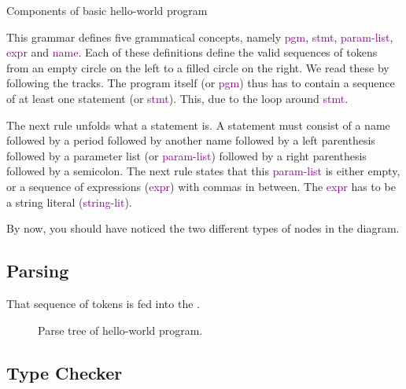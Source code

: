 \begin{syntaxfloat}
  
  \caption{Components of basic hello-world program}
  \label{syntax:first:hello}
\end{syntaxfloat}

This grammar defines five grammatical concepts, namely \textcolor{purple}{pgm}, \textcolor{purple}{stmt}, \textcolor{purple}{param-list}, \textcolor{purple}{expr} and \textcolor{purple}{name}. Each of these definitions define the valid sequences of tokens from an empty circle on the left to a filled circle on the right. We read these by following the tracks. The program itself (or \textcolor{purple}{pgm}) thus has to contain a sequence of at least one statement (or \textcolor{purple}{stmt}). This, due to the loop around \textcolor{purple}{stmt}. %

The next rule unfolds what a statement is. A statement must consist of a name followed by a period followed by another name followed by a left parenthesis followed by a parameter list (or \textcolor{purple}{param-list}) followed by a right parenthesis followed by a semicolon. The next rule states that this \textcolor{purple}{param-list} is either empty, or a sequence of expressions (\textcolor{purple}{expr}) with commas in between. The \textcolor{purple}{expr} has to be a string literal (\textcolor{purple}{string-lit}).

By now, you should have noticed the two different types of nodes in the diagram. 

\subsection{Parsing}

That sequence of tokens is fed into the .

\begin{figure}[tbp]
  
  \caption{Parse tree of hello-world program.}
  \label{fig:first:hello:parsetree}
\end{figure}

\subsection{Type Checker}

